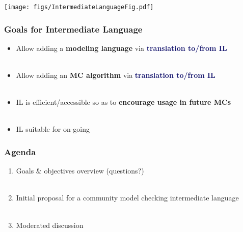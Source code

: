 \documentclass[dvipsnames,svgnames]{beamer}
\begin{document}
\begin{frame}

  \begin{center}
\texttt{[image: figs/IntermediateLanguageFig.pdf]}
\end{center}

\end{frame}


\begin{frame}
  \frametitle{Goals for Intermediate Language}

  \begin{itemize}
\item Allow adding a \textcolor{RedViolet}{\bf modeling language} via \textcolor{MidnightBlue}{\bf translation to/from IL} \\ \ \\
\item Allow adding an \textcolor{RedViolet}{\bf MC algorithm} via \textcolor{MidnightBlue}{\bf translation to/from IL}  \\ \ \\
\item IL is efficient/accessible so as to \textcolor{OliveGreen}{\bf encourage usage in future MCs}  \\ \ \\
\item IL suitable for on-going 

    \end{itemize}

  \end{frame}


\begin{frame}
\frametitle{Agenda}

\begin{enumerate}
\item Goals \& objectives overview (questions?) \\ \ \\
\item Initial proposal for a community model checking intermediate language \\ \ \\
  \item Moderated discussion
\end{enumerate}

\end{frame}
\end{document}
